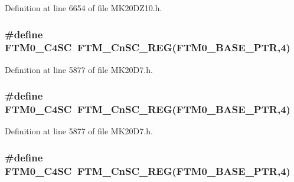 Definition at line 6654 of file M\+K20\+D\+Z10.\+h.

\subsubsection[{\texorpdfstring{F\+T\+M0\+\_\+\+C4\+SC}{FTM0_C4SC}}]{\setlength{\rightskip}{0pt plus 5cm}\#define F\+T\+M0\+\_\+\+C4\+SC~{\bf F\+T\+M\+\_\+\+Cn\+S\+C\+\_\+\+R\+EG}({\bf F\+T\+M0\+\_\+\+B\+A\+S\+E\+\_\+\+P\+TR},4)}\hypertarget{group___f_t_m___register___accessor___macros_ga528cd8d8ccae59ee633980b3d0fd26e6}{}\label{group___f_t_m___register___accessor___macros_ga528cd8d8ccae59ee633980b3d0fd26e6}


Definition at line 5877 of file M\+K20\+D7.\+h.

\subsubsection[{\texorpdfstring{F\+T\+M0\+\_\+\+C4\+SC}{FTM0_C4SC}}]{\setlength{\rightskip}{0pt plus 5cm}\#define F\+T\+M0\+\_\+\+C4\+SC~{\bf F\+T\+M\+\_\+\+Cn\+S\+C\+\_\+\+R\+EG}({\bf F\+T\+M0\+\_\+\+B\+A\+S\+E\+\_\+\+P\+TR},4)}\hypertarget{group___f_t_m___register___accessor___macros_ga528cd8d8ccae59ee633980b3d0fd26e6}{}\label{group___f_t_m___register___accessor___macros_ga528cd8d8ccae59ee633980b3d0fd26e6}


Definition at line 5877 of file M\+K20\+D7.\+h.

\subsubsection[{\texorpdfstring{F\+T\+M0\+\_\+\+C4\+SC}{FTM0_C4SC}}]{\setlength{\rightskip}{0pt plus 5cm}\#define F\+T\+M0\+\_\+\+C4\+SC~{\bf F\+T\+M\+\_\+\+Cn\+S\+C\+\_\+\+R\+EG}({\bf F\+T\+M0\+\_\+\+B\+A\+S\+E\+\_\+\+P\+TR},4)}\hypertarget{group___f_t_m___register___accessor___macros_ga528cd8d8ccae59ee633980b3d0fd26e6}{}\label{group___f_t_m___register___accessor___macros_ga528cd8d8ccae59ee633980b3d0fd26e6}


